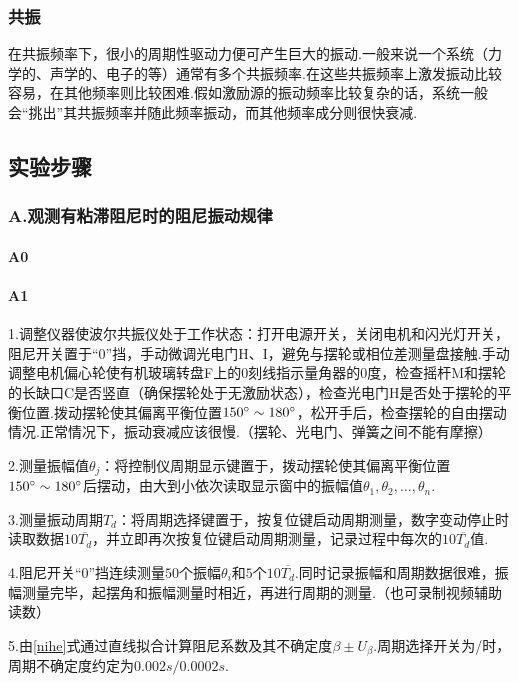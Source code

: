 \documentclass[12pt,a4paper,oneside,left=3.18,right=3.18,top=2.54,bottom=2.54]{ctexart}
\begin{document}
		\subsubsection{共振}
			在共振频率下，很小的周期性驱动力便可产生巨大的振动.一般来说一个系统（力学的、声学的、电子的等）通常有多个共振频率.在这些共振频率上激发振动比较容易，在其他频率则比较困难.假如激励源的振动频率比较复杂的话，系统一般会“挑出”其共振频率并随此频率振动，而其他频率成分则很快衰减.

	\subsection{实验步骤}
		\subsubsection{A.观测有粘滞阻尼时的阻尼振动规律}
			\paragraph{A0}
				\par
			\paragraph{A1}
			\label{p1}
				\par
				\romannumeral1.调整仪器使波尔共振仪处于工作状态：打开电源开关，关闭电机和闪光灯开关，阻尼开关置于“$0$”挡，手动微调光电门H、I，避免与摆轮或相位差测量盘接触.手动调整电机偏心轮使有机玻璃转盘F上的$0$刻线指示量角器的$0$度，检查摇杆M和摆轮的长缺口C是否竖直（确保摆轮处于无激励状态），检查光电门H是否处于摆轮的平衡位置.拨动摆轮使其偏离平衡位置$150^\circ\sim180^\circ$，松开手后，检查摆轮的自由摆动情况.正常情况下，振动衰减应该很慢.（摆轮、光电门、弹簧之间不能有摩擦）\par
				\romannumeral2.测量振幅值$\theta_j$：将控制仪周期显示键置于，拨动摆轮使其偏离平衡位置$150^\circ\sim180^\circ$后摆动，由大到小依次读取显示窗中的振幅值$\theta_1,\theta_2,\dots,\theta_n$.\par
				\romannumeral3.测量振动周期$T_d$：将周期选择键置于，按复位键启动周期测量，数字变动停止时读取数据$10\overline{T_d}$，并立即再次按复位键启动周期测量，记录过程中每次的$10\overline{T_d}$值.\par
				\romannumeral4.阻尼开关“$0$”挡连续测量$50$个振幅$\theta_i$和$5$个$10\overline{T_d}$.同时记录振幅和周期数据很难，振幅测量完毕，起摆角和振幅测量时相近，再进行周期的测量.（也可录制视频辅助读数）\par
				\romannumeral5.由\eqref{nihe}式通过直线拟合计算阻尼系数及其不确定度$\beta\pm U_\beta$.周期选择开关为/时，周期不确定度约定为$0.002s/0.0002s$.
\end{document}
